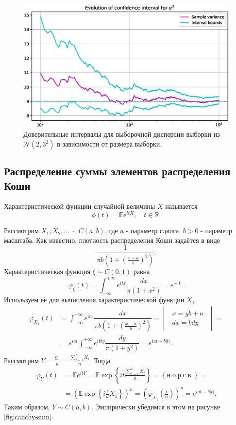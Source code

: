 \documentclass[11pt]{report}
\begin{document}
\begin{figure}[H]
    \centering
    \includegraphics[width=0.9\linewidth]{images/norm-sigma-conf.eps}
    \caption{Доверительные интервалы для выборочной дисперсии выборки из $\mathcal{N}(2,3^2)$ в зависимости от размера выборки.}
    \label{fig:norm-sigma-conf}
\end{figure}

\subsection{Распределение суммы элементов распределения Коши}

\begin{definition}
Характеристической функции случайной величины $X$ называется
$$
\phi(t)=\mathbb Ee^{itX},\quad t\in\mathbb R.
$$
\end{definition}

Рассмотрим $X_1,X_2,\dots\sim C(a,b)$, где $a$ - параметр сдвига, $b>0$ - параметр масштаба. Как известно, плотность распределения Коши задаётся в виде
$$
\dfrac{1}{\pi b\left(1 + (\frac{x-a}{b})^2 \right)}.
$$
Характеристическая функция $\xi\sim C(0,1)$ равна
$$
\varphi_\xi(t) = \int_{-\infty}^{+\infty}e^{itx}\dfrac{dx}{\pi(1+x^2)} = e^{-|t|}.
$$
Используем её для вычисления характеристической функции $X_1$.
$$
\begin{aligned}
\varphi_{X_1}(t) &= \int_{-\infty}^{+\infty}e^{itx}\dfrac{dx}{\pi b\left(1 + (\frac{x-a}{b})^2 \right)} =
\begin{vmatrix}
\begin{array}{c}
x=yb + a \\
dx = bdy
\end{array}
\end{vmatrix} = \\
&= e^{iat}\int_{-\infty}^{+\infty} e^{itby} \dfrac{dy}{\pi(1+y^2)} = e^{iat - b|t|}.
\end{aligned}
$$
Рассмотрим $Y=\frac{S_n}{n} = \frac{\sum_{i=1}^nX_i}{n}$. Тогда
$$
\begin{aligned}
\varphi_Y(t) &= \mathbb{E}e^{itY} = \mathbb{E}\exp\left\{it \frac{\sum_{i=1}^nX_i}{n} \right\} = \left\{ \text{н.о.р.с.в.} \right\} = \\
&= \left( \mathbb{E}\exp\left\{i\frac{t}{n}X_1 \right\} \right)^n = \left( \varphi_{X_1}\left(\frac{t}{n}\right) \right)^n = e^{iat - b|t|}.
\end{aligned}
$$
Таким образом, $Y\sim C(a,b)$. Эмпирически убедимся в этом на рисунке \ref{fig:cauchy-sum}.
\end{document}
